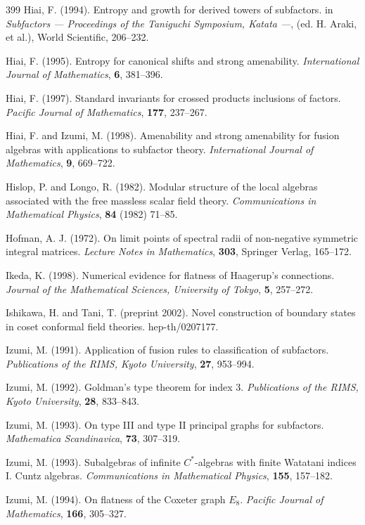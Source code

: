 \documentclass[12pt]{article}
\theoremstyle{plain}
\theoremstyle{definition}
\numberwithin{equation}{section}
\begin{document}
\begin{thebibliography} {399}
Hiai, F. (1994).
Entropy and growth for derived towers of subfactors.
in {\em Subfactors ---
Proceedings of the Taniguchi Symposium, Katata ---},
(ed. H. Araki, et al.),
World Scientific, 206--232.

Hiai, F.  (1995).
Entropy for canonical shifts and strong amenability. 
{\em International Journal of Mathematics},
{\bf 6}, 381--396.

Hiai, F. (1997).
Standard invariants for crossed products inclusions
of factors.
{\em Pacific Journal of Mathematics},
{\bf 177}, 237--267.

Hiai, F. and Izumi, M. (1998).
Amenability and strong amenability for fusion algebras
with applications to subfactor theory.
{\em International Journal of Mathematics}, {\bf 9},
669--722.

Hislop, P. and Longo, R. (1982).
Modular structure of the local algebras
associated with the free massless scalar field theory.
{\em Communications in Mathematical Physics},
{\bf 84} (1982) 71--85.

Hofman, A. J. (1972).
On limit points of spectral radii of non-negative 
symmetric  integral matrices.
{\em Lecture Notes in Mathematics}, {\bf 303}, 
Springer Verlag, 165--172.

Ikeda, K. (1998).
Numerical evidence for flatness of Haagerup's connections.
{\em Journal of the Mathematical Sciences, University of Tokyo},
{\bf 5}, 257--272.

Ishikawa, H. and Tani, T. (preprint 2002).
Novel construction of boundary states in coset
conformal field theories.
hep-th/0207177.

Izumi, M. (1991).
Application of fusion rules to
classification of subfactors.
{\em Publications of the RIMS, Kyoto University},
{\bf 27}, 953--994.

Izumi, M. (1992).
Goldman's type theorem for index 3.
{\em Publications of the RIMS, Kyoto University},
{\bf 28}, 833--843.

Izumi, M. (1993).
On type III and type II principal graphs for
subfactors.
{\em Mathematica Scandinavica}, {\bf 73}, 307--319.

Izumi, M. (1993).
Subalgebras of infinite $C^*$-algebras with
finite Watatani indices I. Cuntz algebras.
{\em Communications in Mathematical Physics},
{\bf 155}, 157--182.

Izumi, M. (1994).
On flatness of the Coxeter graph $E_8$.
{\em Pacific Journal of Mathematics}, {\bf 166},
305--327.


\end{thebibliography}
\end{document}
